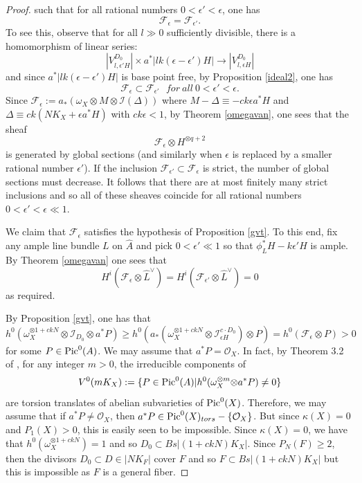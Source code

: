 \documentclass[10pt, a4paper]{amsart}
\newcommand\Pic{{\text{\rm Pic}}}
\newcommand\lra{\longrightarrow}
\newcommand\ot{{\otimes}}
\newcommand\OO{{\mathcal{O}}}
\newcommand\FF{{\mathcal{F}}}
\newcommand\II{{\mathcal{I}}}
\begin{document}
\begin{proof}
such that for all rational numbers $0<\epsilon '<\epsilon$, one has
$$\FF _\epsilon =\FF _{\epsilon '}.$$
To see this, observe that for all $l\gg 0$ sufficiently divisible, 
there is a homomorphism of
linear series:
$$|V^{{D_0}}_{l,\epsilon ' H}|\times a^*|lk(\epsilon -\epsilon ')H|\lra
|V^{D_0}_{l,\epsilon  H}|$$
and since $a^*|lk(\epsilon -\epsilon ')H|$ is base point free, 
by Proposition \ref{ideal2}, one has
$$\FF _\epsilon\subset\FF _{\epsilon '}
\ \ \ for\ all\ 0<\epsilon '<\epsilon .$$ 
Since $\FF _\epsilon:= a_*(\omega _X \ot M \ot \II (\Delta ))$
where $M-\Delta\equiv{ -ck\epsilon }a^*H$ 
and $\Delta\equiv ck(NK_X+\epsilon a^*H)$ with 
$ck\epsilon<1$, 
by Theorem \ref{omegavan}, 
one sees that  the sheaf 
$$\FF _\epsilon\ot
H^{\ot q+2}$$ 
is generated by global sections (and similarly when $\epsilon$ is replaced by
a smaller rational number $\epsilon '$).
If the inclusion $\FF _{\epsilon '}\subset \FF _\epsilon$
is strict, the number of global sections must 
decrease. It follows that there are at most finitely many 
strict inclusions and so all of these sheaves coincide for all
rational numbers $0<\epsilon '< \epsilon \ll 1$.

We claim that $\FF _{\epsilon}$ satisfies the hypothesis of
Proposition \ref{gvt}. To this end, fix any ample line bundle $L$ on
$\hat{A}$ and pick $0<\epsilon ' \ll 1$ so that $\phi _L^*H-k\epsilon ' H$
is ample. By Theorem \ref{omegavan} one sees that $$H^i(\FF _{\epsilon }\ot
\hat {L}^\vee)= H^i(\FF _{\epsilon '}\ot
\hat {L}^\vee)=0$$
as required.

By Proposition \ref{gvt}, one has that 
$$h^0(\omega _X^{\ot 1+ckN}\ot \II _{D_0}\ot a^*P)\geq
h^0(a_*(\omega _X^{\ot 1+ckN}\ot \II ^{c\cdot D_0}_{\epsilon H})\ot P)
=h^0(\FF _\epsilon \ot P)>0$$
for some $P\in \Pic ^0(A)$. We may assume that $a^*P=\OO _X$.
In fact, by Theorem 3.2 of \cite{CH2}, for any integer $m>0$,
the irreducible components of
$$V^0(mK_X):=\{ P\in \Pic ^0(A) | h^0(\omega ^{\ot m}_X \ot a^* P)\ne 0 \}$$
are torsion translates of abelian subvarieties of $\Pic ^0(X)$.
Therefore, we may 
assume that if $a^*P\ne \OO _X$, then
$a^*P\in \Pic ^0(X)_{tors}-\{\OO _X \}$. But since $\kappa (X)=0$ and $P_1(X)>0$,
this is easily seen to be impossible.
Since $\kappa (X)=0$, we have that $h^0(\omega _X^{\ot 1+ckN})=1$ 
and so $D_0\subset Bs |(1+ckN)K_X|$. 
Since $P_N(F)\geq 2$, then the divisors $D_0\subset D\in |NK_F|$ cover
$F$ and so $F\subset Bs|(1+ckN)K_X|$ but this is impossible as $F$ is a general
fiber.


\end{proof}
\end{document}
